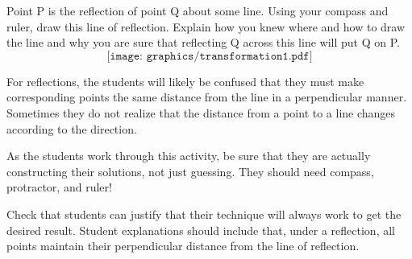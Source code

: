 \documentclass[handout]{ximera}
\begin{document}
\begin{problem}
Point P is the reflection of point Q about some line.  Using your compass and ruler, draw this line of reflection.  Explain how you knew where and how to draw the line and why you are sure that reflecting Q across this line will put Q on P.\\
\vskip 2in
\[
\texttt{[image: graphics/transformation1.pdf]}
\]
\vfill
\begin{instructorNotes}
For reflections, the students will likely be confused that they must make corresponding points the same distance from the line in a perpendicular manner.  Sometimes they do not realize that the distance from a point to a line changes according to the direction.  

As the students work through this activity, be sure that they are actually constructing their solutions, not just guessing.  They should need compass, protractor, and ruler!

Check that students can justify that their technique will always work to get the desired result.   Student explanations should include that, under a reflection, all points maintain their perpendicular distance from the line of reflection.
\end{instructorNotes}

\end{problem}
\end{document}

